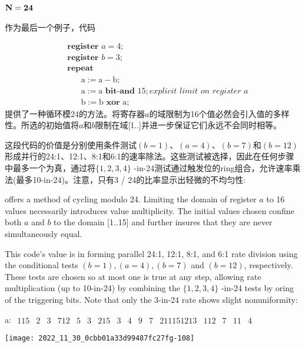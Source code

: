 \begin{CJK}{UTF8}{gbsn}
\subsection*{$\bf{
N=24
}$}

作为最后一个例子，代码

$$
\begin{aligned}
&\textbf { register } a=4 ; \\
&\textbf { register } b=3 ; \\
&\textbf { repeat }\\
&\qquad \mathrm{a}:=\mathrm{a}-\mathrm{b};\\
&\qquad \mathrm{a}:=\mathrm{a} \textbf{ bit-and } 15; \textit{explicit limit on register a}\\
&\qquad \mathrm{b}:=\mathrm{b} \textbf{ xor } \mathrm{a} ;
\end{aligned}
$$
提供了一种循环模24的方法。将寄存器$a$的域限制为16个值必然会引入值的多样性。所选的初始值将$a$和$b$限制在域[1..]并进一步保证它们永远不会同时相等。

这段代码的价值是分别使用条件测试$(b=1)、(a=4)、(b=7)$和$(b=12)$形成并行的24:1、12:1、8:1和6:1的速率除法。这些测试被选择，因此在任何步骤中最多一个为真，通过将$\{1,2,3,4\}$ -in-24测试通过触发位的ring组合，允许速率乘法(最多10-in-24)。注意，只有3 / 24的比率显示出轻微的不均匀性:

offers a method of cycling modulo 24. Limiting the domain of register $a$ to 16 values necessarily introduces value multiplicity. The initial values chosen confine both $a$ and $b$ to the domain [1..15] and further insures that they are never simultaneously equal.

This code's value is in forming parallel 24:1, 12:1, 8:1, and 6:1 rate division using the conditional tests $(b=1),(a=4),(b=7)$ and $(b=12)$, respectively. These tests are chosen so at most one is true at any step, allowing rate multiplication (up to 10-in-24) by combining the $\{1,2,3,4\}$ -in-24 tests by oring of the triggering bits. Note that only the 3-in-24 rate shows slight nonuniformity:

a: $\begin{array}{llllllllllllllll}115 & 2 & 3 & 712 & 5 & 3 & 215 & 3 & 4 & 9 & 7 & 211151213 & 112 & 7 & 11 & 4\end{array}$

\begin{center}
\texttt{[image: 2022\_11\_30\_0cbb01a33d99487fc27fg-108]}
\end{center}


\end{CJK}

